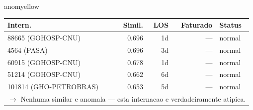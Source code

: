\documentclass[a4paper,10pt]{article}
\begin{document}
\begin{anomalycard}[Internacao 119547 | GHO-PETROBRAS | MODERADO (z=2.06)]{anomyellow}
\begin{tabular}{l r r r l}\toprule\textbf{Intern.} & \textbf{Simil.} & \textbf{LOS} & \textbf{Faturado} & \textbf{Status} \\\midrule
88665 (GOHOSP-CNU) & 0.696 & 1d & --- & \textcolor{jcubeblue}{normal} \\
4564 (PASA) & 0.696 & 3d & --- & \textcolor{jcubeblue}{normal} \\
60915 (GOHOSP-CNU) & 0.678 & 1d & --- & \textcolor{jcubeblue}{normal} \\
51214 (GOHOSP-CNU) & 0.662 & 6d & --- & \textcolor{jcubeblue}{normal} \\
101814 (GHO-PETROBRAS) & 0.653 & 5d & --- & \textcolor{jcubeblue}{normal} \\
\multicolumn{5}{l}{\textcolor{jcubeblue}{\small $\rightarrow$ Nenhuma similar e anomala --- esta internacao e verdadeiramente atipica.}} \\
\bottomrule\end{tabular}


\end{anomalycard}

\newpage
\end{document}
